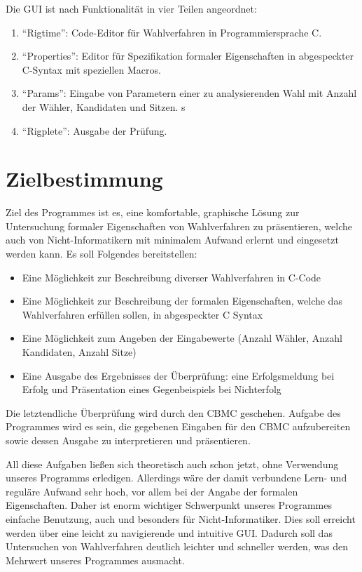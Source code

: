 \documentclass[a4paper]{scrreprt}
\begin{document}
Die \ac{GUI} ist nach Funktionalität in vier Teilen angeordnet:
\begin{enumerate}
\item "`Rigtime"': Code-Editor für Wahlverfahren in Programmiersprache C.
\item "`Properties"': Editor für Spezifikation formaler Eigenschaften in abgespeckter C-Syntax mit speziellen Macros.
\item "`Params"': Eingabe von Parametern einer zu analysierenden Wahl mit Anzahl der Wähler, Kandidaten und Sitzen. s
\item "`Rigplete"': Ausgabe der Prüfung.
\end{enumerate}

\chapter{Zielbestimmung}
Ziel des Programmes ist es, eine komfortable, graphische Lösung zur Untersuchung formaler Eigenschaften von Wahlverfahren zu präsentieren, welche auch von Nicht-Informatikern mit minimalem Aufwand erlernt und eingesetzt werden kann. 
Es soll Folgendes bereitstellen:
\begin{itemize}
\item Eine Möglichkeit zur Beschreibung diverser Wahlverfahren in C-Code  
\item Eine Möglichkeit zur Beschreibung der formalen Eigenschaften, welche das Wahlverfahren erfüllen sollen, in abgespeckter C Syntax 
\item Eine Möglichkeit zum Angeben der Eingabewerte (Anzahl Wähler, Anzahl Kandidaten, Anzahl Sitze) 
\item Eine Ausgabe des Ergebnisses der Überprüfung: eine Erfolgsmeldung bei Erfolg und Präsentation eines Gegenbeispiels bei Nichterfolg
\end{itemize}

Die letztendliche Überprüfung wird durch den \ac{CBMC} geschehen. Aufgabe des Programmes wird es sein, die gegebenen Eingaben für den \ac{CBMC} aufzubereiten sowie dessen Ausgabe zu interpretieren und präsentieren. 

All diese Aufgaben ließen sich theoretisch auch schon jetzt, ohne Verwendung unseres Programms erledigen. Allerdings wäre der damit verbundene Lern- und reguläre Aufwand sehr hoch, vor allem bei der Angabe der formalen Eigenschaften. Daher ist enorm wichtiger Schwerpunkt unseres Programmes einfache Benutzung, auch und besonders für Nicht-Informatiker. Dies soll erreicht werden über eine leicht zu navigierende und intuitive \ac{GUI}. Dadurch soll das Untersuchen von Wahlverfahren deutlich leichter und schneller werden, was den Mehrwert unseres Programmes ausmacht.
\end{document}
